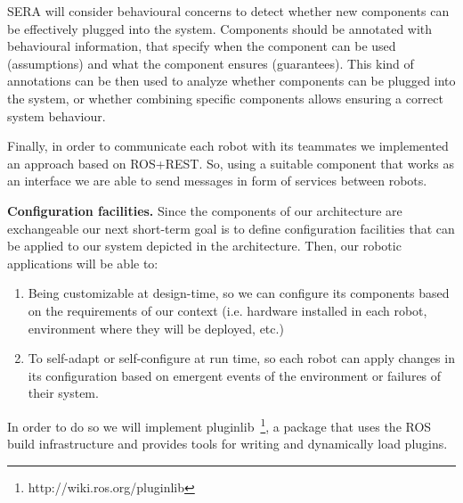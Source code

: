 SERA will consider behavioural concerns to detect whether new components can be effectively plugged into the system. 
Components should be annotated with behavioural information, that specify when the component can be used (assumptions) and what the component ensures (guarantees). 
This kind of annotations can be then used to analyze whether components can be plugged into the system, or whether combining specific components allows ensuring a correct system behaviour. 

Finally, in order to communicate each robot with its teammates we implemented an approach based on ROS+REST.
So, using a suitable component that works as an interface we are able to send messages in form of services between robots.

\textbf{Configuration facilities.}
Since the components of our architecture are exchangeable our next short-term goal is to define configuration facilities that can be applied to our system depicted in the architecture.
Then, our robotic applications will be able to:

\begin{enumerate}
\item Being customizable at design-time, so we can configure its components based on the requirements of our context (i.e. hardware installed in each robot, environment where they will be deployed, etc.)
\item To self-adapt or self-configure at run time, so each robot can apply changes in its configuration based on emergent events of the environment or failures of their system.
\end{enumerate}

In order to do so we will implement pluginlib~\footnote{http://wiki.ros.org/pluginlib}, a package that uses the ROS build infrastructure and provides tools for writing and dynamically load plugins.



